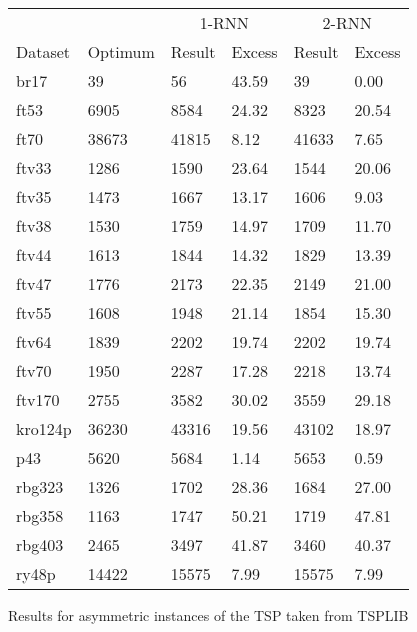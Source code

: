 \begin{figure}[ht]
	\centering
	\begin{minipage}{\linewidth}
		\centering
		\small
		\begin{tabular*}{\linewidth}{*{6}{l}}
			\toprule
			&& \multicolumn{2}{c}{1-RNN}& \multicolumn{2}{c}{2-RNN} \\
			\cmidrule(lr){3-4}
			\cmidrule(lr){5-6}
			Dataset & Optimum & Result & Excess & Result & Excess \\
			\midrule
			br17    & 39    & 56    & 43.59 & 39    & 0.00  \\
			ft53    & 6905  & 8584  & 24.32 & 8323  & 20.54 \\
			ft70    & 38673 & 41815 & 8.12  & 41633 & 7.65  \\
			ftv33   & 1286  & 1590  & 23.64 & 1544  & 20.06 \\
			ftv35   & 1473  & 1667  & 13.17 & 1606  & 9.03  \\
			ftv38   & 1530  & 1759  & 14.97 & 1709  & 11.70 \\
			ftv44   & 1613  & 1844  & 14.32 & 1829  & 13.39 \\
			ftv47   & 1776  & 2173  & 22.35 & 2149  & 21.00 \\
			ftv55   & 1608  & 1948  & 21.14 & 1854  & 15.30 \\
			ftv64   & 1839  & 2202  & 19.74 & 2202  & 19.74 \\
			ftv70   & 1950  & 2287  & 17.28 & 2218  & 13.74 \\
			ftv170  & 2755  & 3582  & 30.02 & 3559  & 29.18 \\
			kro124p & 36230 & 43316 & 19.56 & 43102 & 18.97 \\
			p43     & 5620  & 5684  & 1.14  & 5653  & 0.59  \\
			rbg323  & 1326  & 1702  & 28.36 & 1684  & 27.00 \\
			rbg358  & 1163  & 1747  & 50.21 & 1719  & 47.81 \\
			rbg403  & 2465  & 3497  & 41.87 & 3460  & 40.37 \\
			ry48p   & 14422 & 15575 & 7.99  & 15575 & 7.99  \\
			\bottomrule
		\end{tabular*}
	\end{minipage}
	
	\caption{Results for  asymmetric instances of the TSP taken from TSPLIB \cite{REINELT1995}}
	\label{fig:ATSP}
\end{figure}